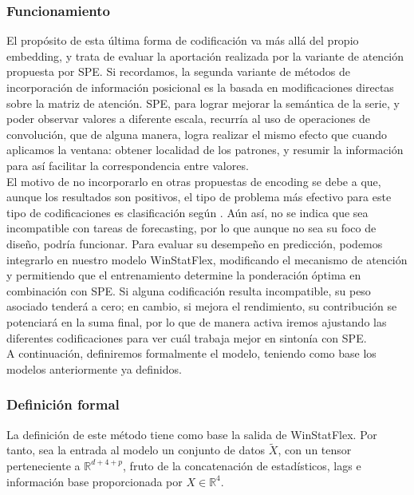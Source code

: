 \subsubsection{Funcionamiento}

El propósito de esta última forma de codificación va más allá del propio embedding, y trata de evaluar la aportación realizada por la variante de atención propuesta por SPE. Si recordamos, la segunda variante de métodos de incorporación de información posicional es la basada en modificaciones directas sobre la matriz de atención. SPE, para lograr mejorar la semántica de la serie, y poder observar valores a diferente escala, recurría al uso de operaciones de convolución, que de alguna manera, logra realizar el mismo efecto que cuando aplicamos la ventana: obtener localidad de los patrones, y resumir la información para así facilitar la correspondencia entre valores.\\

El motivo de no incorporarlo en otras propuestas de encoding se debe a que, aunque los resultados son positivos, el tipo de problema más efectivo para este tipo de codificaciones es clasificación según \cite{irani2025positionalencodingtransformerbasedtime}. Aún así, no se indica que sea incompatible con tareas de forecasting, por lo que aunque no sea su foco de diseño, podría funcionar. Para evaluar su desempeño en predicción, podemos integrarlo en nuestro modelo WinStatFlex, modificando el mecanismo de atención y permitiendo que el entrenamiento determine la ponderación óptima en combinación con SPE. Si alguna codificación resulta incompatible, su peso asociado tenderá a cero; en cambio, si mejora el rendimiento, su contribución se potenciará en la suma final, por lo que de manera activa iremos ajustando las diferentes codificaciones para ver cuál trabaja mejor en sintonía con SPE.\\

A continuación, definiremos formalmente el modelo, teniendo como base los modelos anteriormente ya definidos.


\subsubsection{Definición formal}

La definición de este método tiene como base la salida de WinStatFlex. Por tanto, sea la entrada al modelo un conjunto de datos $\tilde{X}$, con un tensor perteneciente a $\mathbb{R}^{d + 4 + p}$, fruto de la concatenación de estadísticos, lags e información base proporcionada por $X  \in \mathbb{R}^4$.

